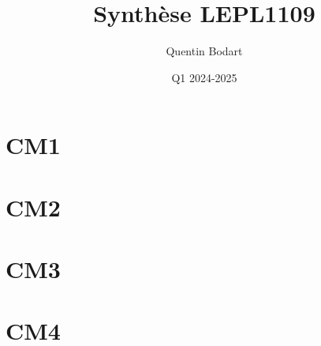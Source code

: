 \documentclass{article}
\title{Synthèse LEPL1109}
\author{Quentin Bodart}
\date{Q1 2024-2025}
\begin{document}
\maketitle
\tableofcontents
\pagebreak

\section{CM1}
\pagebreak
\section{CM2}
\pagebreak
\section{CM3}
\pagebreak
\section{CM4}
    
\end{document}
